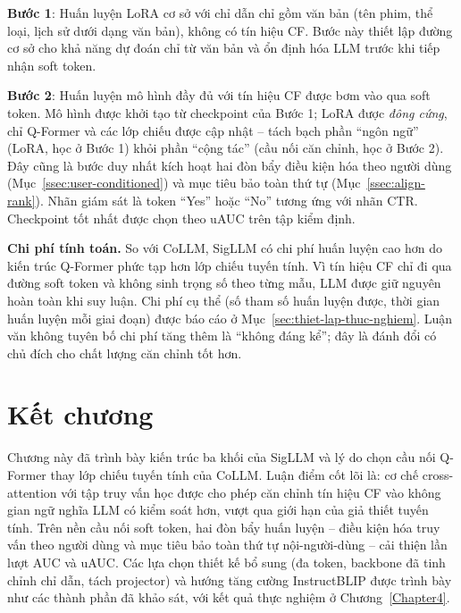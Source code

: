 \textbf{Bước 1}: Huấn luyện LoRA cơ sở với chỉ dẫn chỉ gồm văn bản (tên phim, thể loại,
lịch sử dưới dạng văn bản), không có tín hiệu CF. Bước này thiết lập đường cơ sở cho
khả năng dự đoán chỉ từ văn bản và ổn định hóa LLM trước khi tiếp nhận soft token.

\textbf{Bước 2}: Huấn luyện mô hình đầy đủ với tín hiệu CF được bơm vào qua soft token.
Mô hình được khởi tạo từ checkpoint của Bước 1; LoRA được \textit{đông cứng}, chỉ Q-Former
và các lớp chiếu được cập nhật -- tách bạch phần ``ngôn ngữ'' (LoRA, học ở Bước 1) khỏi
phần ``cộng tác'' (cầu nối căn chỉnh, học ở Bước 2). Đây cũng là bước duy nhất kích hoạt
hai đòn bẩy điều kiện hóa theo người dùng (Mục~\ref{ssec:user-conditioned}) và mục tiêu
bảo toàn thứ tự (Mục~\ref{ssec:align-rank}). Nhãn giám sát là token ``Yes'' hoặc ``No''
tương ứng với nhãn CTR. Checkpoint tốt nhất được chọn theo uAUC trên tập kiểm định.

\textbf{Chi phí tính toán.} So với CoLLM, SigLLM có chi phí huấn luyện cao hơn do kiến
trúc Q-Former phức tạp hơn lớp chiếu tuyến tính. Vì tín hiệu CF chỉ đi qua đường soft
token và không sinh trọng số theo từng mẫu, LLM được giữ nguyên hoàn toàn khi suy luận.
Chi phí cụ thể (số tham số huấn luyện được, thời gian huấn luyện mỗi giai đoạn) được báo
cáo ở Mục~\ref{sec:thiet-lap-thuc-nghiem}. Luận văn không tuyên bố chi phí tăng thêm là
``không đáng kể''; đây là đánh đổi có chủ đích cho chất lượng căn chỉnh tốt hơn.

\section{Kết chương}
\label{sec:ket-chuong-3}

Chương này đã trình bày kiến trúc ba khối của SigLLM và lý do chọn cầu nối Q-Former thay
lớp chiếu tuyến tính của CoLLM. Luận điểm cốt lõi là: cơ chế cross-attention với tập
truy vấn học được cho phép căn chỉnh tín hiệu CF vào không gian ngữ nghĩa LLM có kiểm
soát hơn, vượt qua giới hạn của giả thiết tuyến tính. Trên nền cầu nối soft token, hai
đòn bẩy huấn luyện -- điều kiện hóa truy vấn theo người dùng và mục tiêu bảo toàn thứ tự
nội-người-dùng -- cải thiện lần lượt AUC và uAUC. Các lựa chọn thiết kế bổ sung (đa token,
backbone đã tinh chỉnh chỉ dẫn, tách projector) và hướng tăng cường InstructBLIP được trình
bày như các thành phần đã khảo sát, với kết quả thực nghiệm ở Chương~\ref{Chapter4}.
